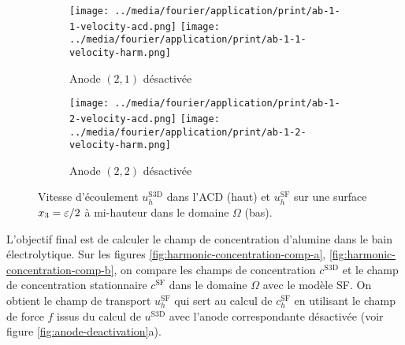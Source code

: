 \begin{figure}[h]
  \begin{center}
    \begin{subfigure}[t]{\textwidth}
      \begin{center}
        \texttt{[image: ../media/fourier/application/print/ab-1-1-velocity-acd.png]}
        \texttt{[image: ../media/fourier/application/print/ab-1-1-velocity-harm.png]}
        \caption{Anode $(2,1)$ désactivée}
        \label{fig:}
      \end{center}
    \end{subfigure}

    \begin{subfigure}[t]{\textwidth}
      \begin{center}
        \texttt{[image: ../media/fourier/application/print/ab-1-2-velocity-acd.png]}
        \texttt{[image: ../media/fourier/application/print/ab-1-2-velocity-harm.png]}
        \caption{Anode $(2,2)$ désactivée}
        \label{fig:}
      \end{center}
    \end{subfigure}


    \caption{Vitesse d'écoulement $u_h^\mathrm{S3D}$ dans l'ACD (haut)
      et $u_h^\mathrm{SF}$ sur une surface $x_3 = \varepsilon / 2$ à
      mi-hauteur dans le domaine $\Omega$ (bas).}

    \label{fig:harmonic-velocity-comp-b}
  \end{center}
\end{figure}

L'objectif final est de calculer le champ de concentration d'alumine
dans le bain électrolytique. Sur les figures
\ref{fig:harmonic-concentration-comp-a},
\ref{fig:harmonic-concentration-comp-b}, on compare les champs de
concentration $c^\mathrm{S3D}$ et le champ de concentration
stationnaire $c^\mathrm{SF}$ dans le domaine $\Omega$ avec le modèle
SF. On obtient le champ de transport $u_h^\mathrm{SF}$ qui sert au
calcul de $c_h^\mathrm{SF}$ en utilisant le champ de force $f$ issus
du calcul de $u^\mathrm{S3D}$ avec l'anode correspondante désactivée
(voir figure \ref{fig:anode-deactivation}a).

